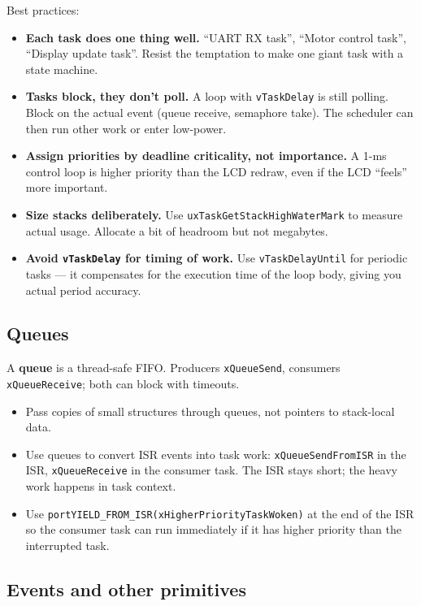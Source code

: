 \documentclass[11pt,a4paper]{article}
\begin{document}
Best practices:
\begin{itemize}[leftmargin=*]
    \item \textbf{Each task does one thing well.} ``UART RX task'',
    ``Motor control task'', ``Display update task''. Resist the temptation
    to make one giant task with a state machine.
    \item \textbf{Tasks block, they don't poll.} A loop with \texttt{vTaskDelay}
    is still polling. Block on the actual event (queue receive, semaphore
    take). The scheduler can then run other work or enter low-power.
    \item \textbf{Assign priorities by deadline criticality, not
    importance.} A 1-ms control loop is higher priority than the LCD
    redraw, even if the LCD ``feels'' more important.
    \item \textbf{Size stacks deliberately.} Use
    \texttt{uxTaskGetStackHighWaterMark} to measure actual usage.
    Allocate a bit of headroom but not megabytes.
    \item \textbf{Avoid \texttt{vTaskDelay} for timing of work.} Use
    \texttt{vTaskDelayUntil} for periodic tasks --- it compensates for the
    execution time of the loop body, giving you actual period accuracy.
\end{itemize}

\subsection{Queues}

A \textbf{queue} is a thread-safe FIFO. Producers \texttt{xQueueSend},
consumers \texttt{xQueueReceive}; both can block with timeouts.

\begin{itemize}[leftmargin=*]
    \item Pass copies of small structures through queues, not pointers to
    stack-local data.
    \item Use queues to convert ISR events into task work:
    \texttt{xQueueSendFromISR} in the ISR, \texttt{xQueueReceive} in the
    consumer task. The ISR stays short; the heavy work happens in task
    context.
    \item Use \texttt{portYIELD\_FROM\_ISR(xHigherPriorityTaskWoken)} at
    the end of the ISR so the consumer task can run immediately if it has
    higher priority than the interrupted task.
\end{itemize}

\subsection{Events and other primitives}
\end{document}
